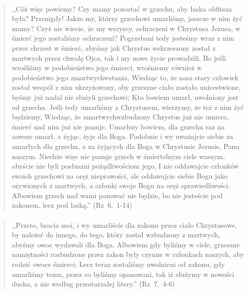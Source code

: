 \documentclass[10pt,a4paper,oneside]{article}
\begin{document}
\paragraph{}
\begin{quote}
,,Cóż więc powiemy? Czy mamy pozostać w grzechu, aby łaska obfitsza była? Przenigdy! Jakże my, którzy grzechowi umarliśmy, jeszcze w nim żyć mamy? Czyż nie wiecie, że my wszyscy, ochrzczeni w Chrystusa Jezusa, w śmierć jego zostaliśmy ochrzczeni? Pogrzebani tedy jesteśmy wraz z nim przez chrzest w śmierć, abyśmy jak Chrystus wskrzeszony został z martwych przez chwałę Ojca, tak i my nowe życie prowadzili. Bo jeśli wrośliśmy w podobieństwo jego śmierci, wrośniemy również w podobieństwo jego zmartwychwstania, Wiedząc to, że nasz stary człowiek został wespół z nim ukrzyżowany, aby grzeszne ciało zostało unicestwione, byśmy już nadal nie służyli grzechowi; Kto bowiem umarł, uwolniony jest od grzechu. Jeśli tedy umarliśmy z Chrystusem, wierzymy, że też z nim żyć będziemy, Wiedząc, że zmartwychwzbudzony Chrystus już nie umiera, śmierć nad nim już nie panuje. Umarłszy bowiem, dla grzechu raz na zawsze umarł, a żyjąc, żyje dla Boga. Podobnie i wy uważajcie siebie za umarłych dla grzechu, a za żyjących dla Boga w Chrystusie Jezusie, Panu naszym. Niechże więc nie panuje grzech w śmiertelnym ciele waszym, abyście nie byli posłuszni pożądliwościom jego, I nie oddawajcie członków swoich grzechowi na oręż nieprawości, ale oddawajcie siebie Bogu jako ożywionych z martwych, a członki swoje Bogu na oręż sprawiedliwości. Albowiem grzech nad wami panować nie będzie, bo nie jesteście pod zakonem, lecz pod łaską.'' \mbox{(Rz 6, 1-14)}
\end{quote}
\paragraph{}
\begin{quote}
,,Przeto, bracia moi, i wy umarliście dla zakonu przez ciało Chrystusowe, by należeć do innego, do tego, który został wzbudzony z martwych, abyśmy owoc wydawali dla Boga. Albowiem gdy byliśmy w ciele, grzeszne namiętności rozbudzone przez zakon były czynne w członkach naszych, aby rodzić owoce śmierci; Lecz teraz zostaliśmy uwolnieni od zakonu, gdy umarliśmy temu, przez co byliśmy opanowani, tak iż służymy w nowości ducha, a nie według przestarzałej litery.'' \mbox{(Rz 7, 4-6)}
\end{quote}
\end{document}
